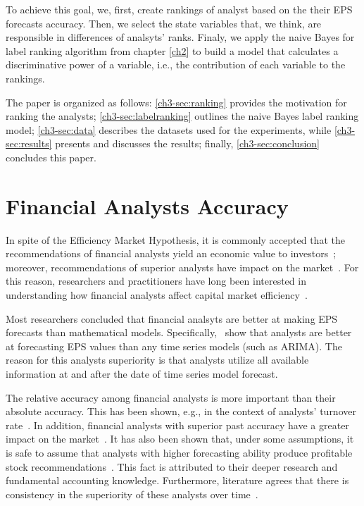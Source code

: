 To achieve this goal, we, first, create rankings of analyst based on the their EPS forecasts accuracy. Then, we select the state variables that, we think,  are responsible in differences of analsyts' ranks. Finaly, we apply the naive Bayes for label ranking algorithm from chapter \vref{ch2} to build a model that calculates a discriminative power of a variable, i.e., the contribution of each variable to the rankings.

The paper is organized as follows: \vref{ch3-sec:ranking} provides the motivation for ranking the analysts; \vref{ch3-sec:labelranking} outlines the naive Bayes label ranking model; \vref{ch3-sec:data} describes the datasets used for the experiments, while \vref{ch3-sec:results} presents and discusses the results; finally, \vref{ch3-sec:conclusion} concludes this paper.


\section{Financial Analysts Accuracy}
\label{ch3-sec:ranking}
In spite of the Efficiency Market Hypothesis, it is commonly accepted that the recommendations of financial analysts yield an economic value to investors~\citep{womack1996}; moreover, recommendations of superior analysts have impact on the market~\citep{loh2011}. For this reason, researchers and practitioners have long been interested in understanding how financial analysts affect capital market efficiency~\citep{ramnath2008faf}.

Most researchers concluded that financial analsyts are better at making EPS forecasts than mathematical models. Specifically,~\cite{fried1982,bouwman1987,brown1991} show that analysts are better at forecasting EPS values than any time series models (such as ARIMA). The reason for this analysts superiority is that analysts utilize all available information at and after the date of time series model forecast.

The relative accuracy among financial analysts is more important than their absolute accuracy. This has been shown, e.g., in the context of analysts’ turnover rate~\citep{michaely1999}. In addition, financial analysts with superior past accuracy have a greater impact on the market~\citep{park2000analyst}. It has also been shown that, under some assumptions, it is safe to assume that analysts with higher forecasting ability produce profitable stock recommendations~\citep{loh2006aef}. This fact is attributed to their deeper research and fundamental accounting knowledge. Furthermore, literature agrees that there is consistency in the superiority of these analysts over time~\citep{li2005persistence,hilary2013}.


